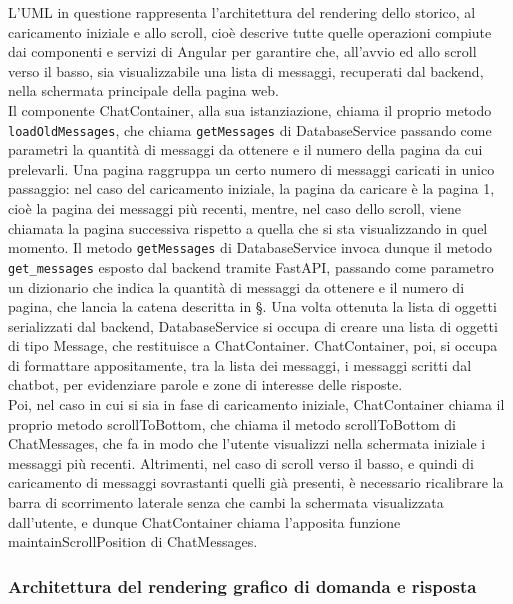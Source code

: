 L'UML in questione rappresenta l'architettura del rendering dello storico, al caricamento iniziale e allo scroll, cioè descrive tutte quelle operazioni compiute dai componenti e servizi di Angular per garantire che, all'avvio ed allo scroll verso il basso, sia visualizzabile una lista di messaggi, recuperati dal backend, nella schermata principale della pagina web.\\
Il componente ChatContainer, alla sua istanziazione, chiama il proprio metodo \texttt{loadOldMessages}, che chiama \texttt{getMessages} di DatabaseService passando come parametri la quantità di messaggi da ottenere e il numero della pagina da cui prelevarli. Una pagina raggruppa un certo numero di messaggi caricati in unico passaggio: nel caso del caricamento iniziale, la pagina da caricare è la pagina 1, cioè la pagina dei messaggi più recenti, mentre, nel caso dello scroll, viene chiamata la pagina successiva rispetto a quella che si sta visualizzando in quel momento. Il metodo \texttt{getMessages} di DatabaseService invoca dunque il metodo \texttt{get\_messages} esposto dal backend tramite FastAPI, passando come parametro un dizionario che indica la quantità di messaggi da ottenere e il numero di pagina, che lancia la catena descritta in \S{}. Una volta ottenuta la lista di oggetti serializzati dal backend, DatabaseService si occupa di creare una lista di oggetti di tipo Message, che restituisce a ChatContainer. ChatContainer, poi, si occupa di formattare appositamente, tra la lista dei messaggi, i messaggi scritti dal chatbot, per evidenziare parole e zone di interesse delle risposte.\\
Poi, nel caso in cui si sia in fase di caricamento iniziale, ChatContainer chiama il proprio metodo scrollToBottom, che chiama il metodo scrollToBottom di ChatMessages, che fa in modo che l'utente visualizzi nella schermata iniziale i messaggi più recenti. Altrimenti, nel caso di scroll verso il basso, e quindi di caricamento di messaggi sovrastanti quelli già presenti, è necessario ricalibrare la barra di scorrimento laterale senza che cambi la schermata visualizzata dall'utente, e dunque ChatContainer chiama l'apposita funzione maintainScrollPosition di ChatMessages.

\newpage


\subsubsection{Architettura del rendering grafico di domanda e risposta}
\label{sec:architettura_rendering_domanda_risposta}

